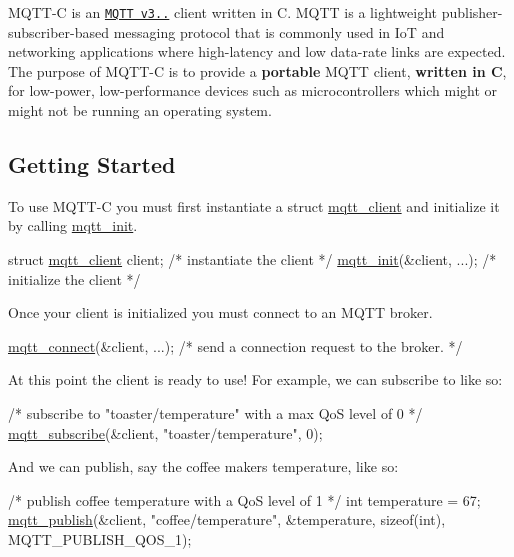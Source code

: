 M\+Q\+T\+T-\/C is an \href{http://docs.oasis-open.org/mqtt/mqtt/v3.1.1/os/mqtt-v3.1.1-os.html}{\tt M\+Q\+TT v3..} client written in C. M\+Q\+TT is a lightweight publisher-\/subscriber-\/based messaging protocol that is commonly used in IoT and networking applications where high-\/latency and low data-\/rate links are expected. The purpose of M\+Q\+T\+T-\/C is to provide a {\bfseries portable} M\+Q\+TT client, {\bfseries written in C}, for low-\/power, low-\/performance devices such as microcontrollers which might or might not be running an operating system.

\subsection*{Getting Started}

To use M\+Q\+T\+T-\/C you must first instantiate a {\ttfamily struct \hyperlink{structmqtt__client}{mqtt\+\_\+client}} and initialize it by calling \hyperlink{group__api_gab07105b049dd86a8ec39c518cf9fa4c7}{mqtt\+\_\+init}. 
\begin{DoxyCode}
\textcolor{keyword}{struct }\hyperlink{structmqtt__client}{mqtt\_client} client; \textcolor{comment}{/* instantiate the client */}
\hyperlink{group__api_gab07105b049dd86a8ec39c518cf9fa4c7}{mqtt\_init}(&client, ...);   \textcolor{comment}{/* initialize the client */}
\end{DoxyCode}
 Once your client is initialized you must connect to an M\+Q\+TT broker. 
\begin{DoxyCode}
\hyperlink{group__api_gadbe914e5a9d4f93314c4e7637cb4f7b3}{mqtt\_connect}(&client, ...); \textcolor{comment}{/* send a connection request to the broker. */}
\end{DoxyCode}
 At this point the client is ready to use! For example, we can subscribe to like so\+: 
\begin{DoxyCode}
\textcolor{comment}{/* subscribe to "toaster/temperature" with a max QoS level of 0 */}
\hyperlink{group__api_gaea5da9b546f6e91eb77c9eff9c478de5}{mqtt\_subscribe}(&client, \textcolor{stringliteral}{"toaster/temperature"}, 0);
\end{DoxyCode}
 And we can publish, say the coffee makers temperature, like so\+: 
\begin{DoxyCode}
\textcolor{comment}{/* publish coffee temperature with a QoS level of 1 */}
\textcolor{keywordtype}{int} temperature = 67;
\hyperlink{group__api_ga0d8fed24a799ab9b55eeb28f3cd2d0a8}{mqtt\_publish}(&client, \textcolor{stringliteral}{"coffee/temperature"}, &temperature, \textcolor{keyword}{sizeof}(\textcolor{keywordtype}{int}), MQTT\_PUBLISH\_QOS\_1);
\end{DoxyCode}


